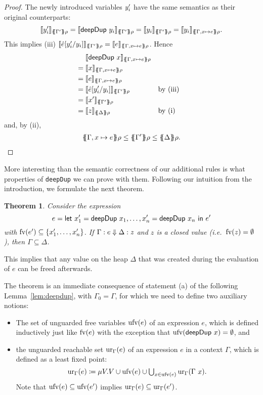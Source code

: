 \documentclass[preprint]{sigplanconf}
\newtheorem{theorem}{Theorem}
\theoremstyle{nonumberplain}
\newtheorem{proof}{Proof}
\newcommand{\li}{\lstinline[style=Haskell]}
\begin{document}
\begin{proof}
The newly introduced variables $y'_i$ have the same semantics as their original counterparts:
\[
\dsem{\fresh y_i}{\esem{\Gamma'}\rho}
= \dsem{\sDeepDup {y_i}}{\esem{\Gamma'}\rho}
= \dsem{y_i}{\esem{\Gamma'}\rho}
= \dsem{y_i}{\esem{\Gamma, x\mapsto e}\rho}.
\]
This implies (iii) $\dsem{\hat e[\fresh y_i/y_i]}{\esem{\Gamma'}\rho} = \dsem{e}{\esem{\Gamma, x\mapsto e}\rho}$. Hence
\begin{align*}
&\phantom{{}={}}\dsem{\sDeepDup x}{\esem{\Gamma, x\mapsto e}\rho}\\
&= \dsem{x}{\esem{\Gamma, x\mapsto e}\rho}\\
&= \dsem{e}{\esem{\Gamma, x\mapsto e}\rho}\\
&= \dsem{\hat e[\fresh y_i/y_i]}{\esem{\Gamma'}\rho} &&\text{by (iii)}\\
&= \dsem{\fresh x}{\esem{\Gamma'}\rho}\\
&= \dsem{z}{\esem \Delta \rho} &&\text{by (i)}
\end{align*}
and, by (ii),
\begin{align*}
\esem{\Gamma, x\mapsto e}\rho \le \esem{\Gamma'} \rho \le \esem{\Delta}\rho.
\end{align*}
\end{proof}

\pagebreak[2]
More interesting than the semantic correctness of our additional rules is what properties of \li-deepDup- we can prove with them. Following our intuition from the introduction, we formulate the next theorem.

\begin{theorem}
Consider the expression
\[
e=\text{\textsf{let}}\ x_1' = \text{\textsf{deepDup}}\ x_1,\ldots,x_n'= \text{\textsf{deepDup}}\ x_n\ \text{\textsf{in}}\ e'
\]
with $\text{fv}(e') \subseteq \{x_1',\ldots,x_n'\}$. If $\Gamma : e \Downarrow \Delta : z$ and $z$ is a closed value (i.e.\ $\text{fv}(z) = \emptyset$), then $\Gamma \subseteq \Delta$.
\label{thm:deepdup}
\end{theorem}
This implies that any value on the heap $\Delta$ that was created during the evaluation of $e$ can be freed afterwards.

The theorem is an immediate consequence of statement (a) of the following Lemma~\ref{lem:deepdup}, with $\Gamma_0 = \Gamma$, for which we need to define two auxiliary notions:
\begin{itemize}
\item 
The set of unguarded free variables $\text{ufv}(e)$ of an expression $e$, which is defined inductively just like $\text{fv}(e)$ with the exception that $\text{ufv}(\text{\textsf{deepDup}}\ x) = \emptyset$, and 
\item the unguarded reachable set $\text{ur}_{\Gamma}(e)$ of an expression $e$ in a context $\Gamma$, which is defined as a least fixed point:
\[
\text{ur}_{\Gamma}(e) \coloneqq \mu V. V \cup \text{ufv}(e) \cup \textstyle\bigcup_{x\in \text{ufv}(e)}\text{ur}_{\Gamma}(\Gamma\ x).
\]
Note that $\text{ufv}(e) \subseteq \text{ufv}(e')$ implies $\text{ur}_{\Gamma}(e) \subseteq \text{ur}_{\Gamma}(e')$. %
\end{itemize}
\end{document}
